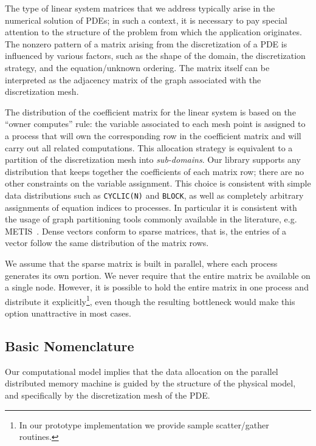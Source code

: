 The type of linear system matrices that we address  typically arise in the
numerical solution of PDEs;  in such a context,
it is necessary to pay special attention to the
structure of the problem from which the application originates. 
The nonzero pattern of a matrix arising from the
discretization of a PDE is influenced by various factors, such as the
shape of the  domain, the discretization strategy, and
the equation/unknown ordering. The matrix itself can be interpreted as
the  adjacency matrix of the graph associated with the discretization
mesh. 

The distribution of the coefficient matrix for the linear system is
based on the ``owner computes'' rule: 
the variable associated to each mesh point is assigned to a process
that will  own the corresponding row in the coefficient matrix and
will  carry out all related computations. This allocation strategy 
is equivalent to a partition of the discretization mesh into {\em
sub-domains}. 
Our library  supports any distribution that keeps together 
the coefficients of each matrix row; there are no other constraints on
the variable assignment. 
This choice is consistent with simple  data distributions 
such as  \verb|CYCLIC(N)| and \verb|BLOCK|, 
as well as completely arbitrary assignments of
equation indices to processes. 
In particular it is consistent with the
usage of graph partitioning tools commonly available in the
literature, e.g. METIS~\cite{METIS}.
Dense vectors  conform  to sparse
matrices, that is, the entries of a vector follow the same distribution
of the matrix rows.  

We assume that the sparse matrix is built in parallel, where each
process generates its own portion. We never require that the entire
matrix be available on a single node. However, it is possible
to hold the entire matrix in one process and distribute it
explicitly\footnote{In our prototype implementation  we provide 
sample scatter/gather routines.}, even though  the resulting 
bottleneck would make this option unattractive in most  cases. 


\subsection{Basic Nomenclature}


Our computational model implies that the data allocation on the
parallel distributed memory machine is guided by the structure of the
physical model, and specifically by the discretization mesh of the
PDE. 

